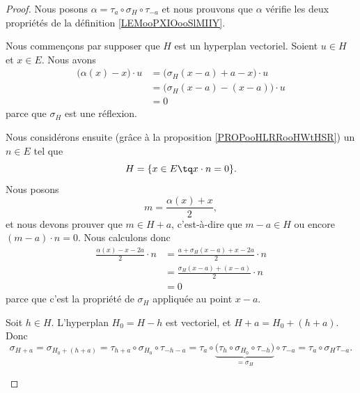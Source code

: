 \begin{proof}
	Nous posons \( \alpha=\tau_a\circ\sigma_H\circ\tau_{-a}\) et nous prouvons que \( \alpha\) vérifie les deux propriétés de la définition \ref{LEMooPXIOooSlMIIY}.
	\begin{subproof}
		Nous commençons par supposer que \( H\) est un hyperplan vectoriel. Soient \( u\in H\) et \( x\in E\). Nous avons
		\begin{subequations}
			\begin{align}
				\big( \alpha(x)-x \big)\cdot u & =\big( \sigma_H(x-a)+a-x \big)\cdot u   \\
				                               & =\big( \sigma_H(x-a)-(x-a) \big)\cdot u \\
				                               & =0
			\end{align}
		\end{subequations}
		parce que \( \sigma_H\) est une réflexion.

		Nous considérons ensuite (grâce à la proposition \ref{PROPooHLRRooHWtHSR}) un \( n\in E\) tel que
		\begin{equation}
			H=\{ x\in E\tq x\cdot n=0 \}.
		\end{equation}
		Nous posons
		\begin{equation}
			m=\frac{ \alpha(x)+x }{ 2 },
		\end{equation}
		et nous devons prouver que \( m\in H+a\), c'est-à-dire que \( m-a\in H\) ou encore \( (m-a)\cdot n=0\). Nous calculons donc
		\begin{subequations}
			\begin{align}
				\frac{ \alpha(x)-x-2a }{ 2 }\cdot n & =\frac{ a+\sigma_H(x-a)+x-2a }{2}\cdot n \\
				                                    & =\frac{ \sigma_H(x-a)+(x-a) }{2}\cdot n  \\
				                                    & =0
			\end{align}
		\end{subequations}
		parce que c'est la propriété de \( \sigma_H\) appliquée au point \( x-a\).

		Soit \( h\in H\). L'hyperplan \( H_0=H-h\) est vectoriel, et \( H+a=H_0+(h+a)\). Donc
		\begin{equation}
			\sigma_{H+a}=\sigma_{H_0+(h+a)}=\tau_{h+a}\circ\sigma_{H_0}\circ \tau_{-h-a}=\tau_a\circ\underbrace{\big( \tau_h\circ\sigma_{H_0}\circ\tau_{-h} \big)}_{=\sigma_H}\circ\tau_{-a}=\tau_a\circ\sigma_H\tau_{-a}.
		\end{equation}
	\end{subproof}
\end{proof}

